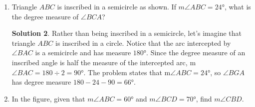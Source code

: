 \documentclass{article}
\theoremstyle{definition}
\newtheorem*{solution}{Solution}
\begin{document}
\begin{multicols}{2}
\begin{enumerate}
\begin{solution}
                Finally, $\angle E = \angle AGB$ because they are inscribed angles subtending the same arc.
                Thus, $\angle E = \angle AGB = \angle DGC = \angle F$.
            \end{solution}
        \item Triangle $ABC$ is inscribed in a semicircle as shown.
            If $m\angle ABC = \ang{24}$, what is the degree measure of $\angle BCA$?
            \begin{center}
            \end{center}
            \begin{solution}
                Rather than being inscribed in a semicircle, let's imagine that triangle $ABC$ is inscribed in a circle.
                Notice that the arc intercepted by $\angle BAC$ is a semicircle and has measure $\ang{180}$.
                Since the degree measure of an inscribed angle is half the measure of the intercepted arc, m$\angle BAC = 180 \div 2 = \ang{90}$.
                The problem states that m$\angle ABC = \ang{24}$, so $\angle BGA$ has degree measure $180 - 24 - 90 = \ang{66}$.
            \end{solution}
        \item In the figure, given that $m\angle ABC = \ang{60}$ and $m\angle BCD = \ang{70}$, find $m\angle CBD$.
            \begin{center}
\end{center}
\end{enumerate}
\end{multicols}
\end{document}
